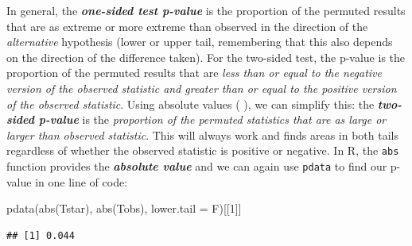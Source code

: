 \documentclass[
]{book}
\newenvironment{Shaded}{\begin{snugshade}}{\end{snugshade}}
\newcommand{\AttributeTok}[1]{\textcolor[rgb]{0.77,0.63,0.00}{#1}}
\newcommand{\DecValTok}[1]{\textcolor[rgb]{0.00,0.00,0.81}{#1}}
\newcommand{\FunctionTok}[1]{\textcolor[rgb]{0.00,0.00,0.00}{#1}}
\newcommand{\NormalTok}[1]{#1}
\begin{document}
\indent In general, the \textbf{\emph{one-sided test p-value}}
is the proportion of the
permuted results that are as extreme or more extreme than observed in the
direction of the \emph{alternative}
hypothesis (lower or upper tail, remembering that this also depends on the
direction of the difference taken). For the two-sided test, the p-value
is the
proportion of the permuted results that are \emph{less than or equal to the negative
version of the observed statistic and greater than or equal to the positive
version of the observed statistic}. Using absolute
values (\textbar{} \textbar), we can simplify this: the \textbf{\emph{two-sided p-value}} is the
\emph{proportion of the \textbar permuted statistics\textbar{} that are as large or larger than
\textbar observed statistic\textbar{}}.
This will always work and finds areas in both tails regardless of whether the
observed statistic is positive or negative. In R, the \texttt{abs} function  provides the
\textbf{\emph{absolute value}} and we can again use \texttt{pdata} to find our p-value in one line
of code:

\begin{Shaded}
\begin{Highlighting}[]
\FunctionTok{pdata}\NormalTok{(}\FunctionTok{abs}\NormalTok{(Tstar), }\FunctionTok{abs}\NormalTok{(Tobs), }\AttributeTok{lower.tail =}\NormalTok{ F)[[}\DecValTok{1}\NormalTok{]]}
\end{Highlighting}
\end{Shaded}

\begin{verbatim}
## [1] 0.044
\end{verbatim}
\end{document}
